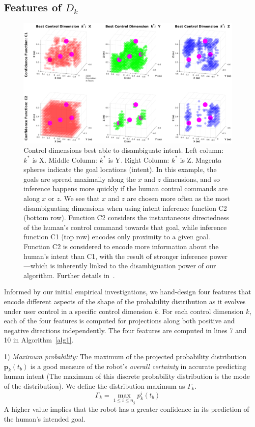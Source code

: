 \documentclass[natbib, twocolumn]{svjour3}          %
\begin{document}
\subsection{Features of $D_k$}\label{ssec:components}
\begin{figure}[t]
	\centering
	\includegraphics[width = 1.15\hsize, height = 0.6\vsize, center]{Fig4.eps}
	\caption{Control dimensions best able to disambiguate intent.  Left column: $k^*$ is X. Middle Column: $k^*$ is Y. Right Column: $k^*$ is Z. Magenta spheres indicate the goal locations (intent). In this example, the goals are spread maximally along the $x$ and $z$ dimensions, and so inference happens more quickly if the human control commands are along $x$ or $z$. We see that $x$ and $z$ are chosen more often as the most disambiguating dimensions when using intent inference function C2 (bottom row). Function C2 considers the instantaneous directedness of the human's control command towards that goal, while inference function C1 (top row) encodes only proximity to a given goal. Function C2 is considered to encode more information about the human's intent than C1, with the result of stronger inference power---which is inherently linked to the disambiguation power of our algorithm. Further details in~\citep{gopinath2017mode}.}
	\label{fig:sim_res}
\end{figure}
Informed by our initial empirical investigations, we hand-design four features that encode different aspects of the shape of the probability distribution as it evolves under user control in a specific control dimension $k$. For each control dimension $k$, each of the four features is computed for projections along both positive and negative directions independently. The four features are computed in lines 7 and 10 in Algorithm~\ref{alg1}.

1) \textit{Maximum probability:} The maximum of the projected probability distribution $\boldsymbol{p}_k(t_b)$ is a good measure of the robot's \textit{overall certainty} in accurate predicting human intent (The maximum of this discrete probability distribution is the mode of the distribution). We define the distribution maximum as $\Gamma_k$.
\begin{equation}
\Gamma_k = \max\limits_{1 \leq i \leq n_g}p^i_k(t_b)
\end{equation}
A higher value implies that the robot has a greater confidence in its prediction of the human's intended goal.
\end{document}
